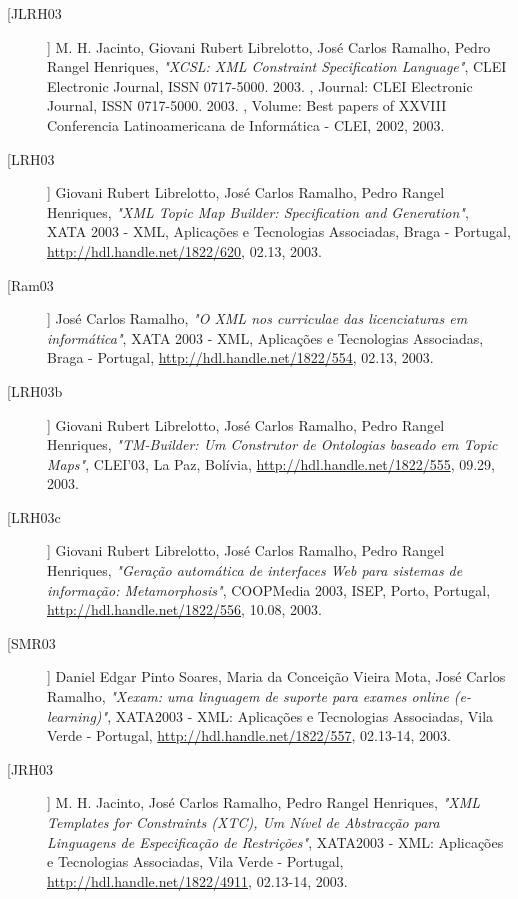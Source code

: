 \begin{description}
\item[[JLRH03]]
    \textsf{M. H.  Jacinto, Giovani Rubert Librelotto, José Carlos Ramalho, Pedro Rangel Henriques}, \emph{"XCSL: XML Constraint Specification Language"}, CLEI Electronic Journal,  ISSN 0717-5000. 2003. , Journal: CLEI Electronic Journal,  ISSN 0717-5000. 2003. , Volume: Best papers of XXVIII Conferencia Latinoamericana de Informática - CLEI, 2002, 2003.

\item[[LRH03]]
    \textsf{Giovani Rubert Librelotto, José Carlos Ramalho, Pedro Rangel Henriques}, \emph{"XML Topic Map Builder: Specification and Generation"}, XATA 2003 - XML, Aplicações e Tecnologias Associadas, Braga - Portugal, \url{http://hdl.handle.net/1822/620}, 02.13, 2003.

\item[[Ram03]]
    \textsf{José Carlos Ramalho}, \emph{"O XML nos curriculae das licenciaturas em informática"}, XATA 2003 - XML, Aplicações e Tecnologias Associadas, Braga - Portugal, \url{http://hdl.handle.net/1822/554}, 02.13, 2003.

\item[[LRH03b]]
    \textsf{Giovani Rubert Librelotto, José Carlos Ramalho, Pedro Rangel Henriques}, \emph{"TM-Builder: Um Construtor de Ontologias baseado em Topic Maps"}, CLEI'03, La Paz, Bolívia, \url{http://hdl.handle.net/1822/555}, 09.29, 2003.

\item[[LRH03c]]
    \textsf{Giovani Rubert Librelotto, José Carlos Ramalho, Pedro Rangel Henriques}, \emph{"Geração automática de interfaces Web para sistemas de informação: Metamorphosis"}, COOPMedia 2003, ISEP, Porto, Portugal, \url{http://hdl.handle.net/1822/556}, 10.08, 2003.

\item[[SMR03]]
    \textsf{Daniel Edgar Pinto Soares, Maria da Conceição Vieira Mota, José Carlos Ramalho}, \emph{"Xexam: uma linguagem de suporte para exames online (e-learning)"}, XATA2003 - XML: Aplicações e Tecnologias Associadas, Vila Verde - Portugal, \url{http://hdl.handle.net/1822/557}, 02.13-14, 2003.

\item[[JRH03]]
    \textsf{M. H.  Jacinto, José Carlos Ramalho, Pedro Rangel Henriques}, \emph{"XML Templates for Constraints (XTC), Um Nível de Abstracção para Linguagens de Especificação de Restrições"}, XATA2003 - XML: Aplicações e Tecnologias Associadas, Vila Verde - Portugal, \url{http://hdl.handle.net/1822/4911}, 02.13-14, 2003.


\end{description}
